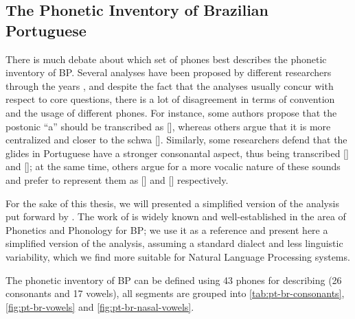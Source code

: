 \subsection{The Phonetic Inventory of Brazilian Portuguese} 

There is much debate about which set of phones best describes the phonetic inventory of \gls{BP}. Several analyses have been proposed by different researchers through the years \cite{Bisol2005, Cagliari2002, Camara1970, Cristofaro2005, Neves1999}, and despite the fact that the analyses usually concur with respect to core questions, there is a lot of disagreement in terms of convention and the usage of different phones.  For instance, some authors propose that the postonic ``a'' should be transcribed as [], whereas others argue that it is more centralized and closer to the schwa []. Similarly, some researchers defend that the glides in Portuguese have a stronger consonantal aspect, thus being transcribed [] and []; at the same time, others argue for a more vocalic nature of these sounds and prefer to represent them as [] and [] respectively. 

For the sake of this thesis, we will presented a simplified version of the analysis put forward by \citet{Cristofaro2005}. The work of \citet{Cristofaro2005} is widely known and well-established in the area of Phonetics and Phonology for \ac{BP}; we use it as a reference and present here a simplified version of the analysis, assuming a standard dialect and less linguistic variability, which we find more suitable for Natural Language Processing systems.

The phonetic inventory of \ac{BP} can be defined using 43 phones for describing (26 consonants and 17 vowels), all segments are grouped into \autoref{tab:pt-br-consonants}, \autoref{fig:pt-br-vowels} and \autoref{fig:pt-br-nasal-vowels}.

